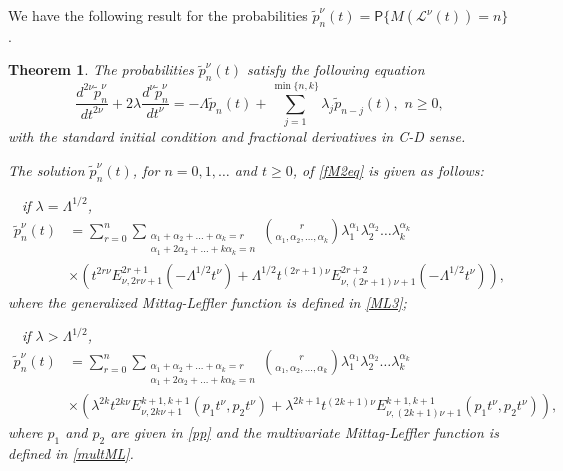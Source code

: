 \documentclass[12pt]{article}
\theoremstyle{definition}
\theoremstyle{plain}
\newtheorem{theorem}{Theorem}
\newcommand{\Prob}{\mathsf{P}}
\begin{document}
We have the following result for the probabilities ${\tilde p}_n^\nu(t)=\Prob\{M(\mathcal{L}^\nu(t))=n\}$.


\begin{theorem}\label{fM2}
The probabilities ${\tilde p}_n^\nu(t)$
satisfy the following  equation
\begin{equation}\label{fM2eq}
	\frac{d^{2\nu} \tilde p_n^\nu}{dt^{2\nu}} + 2\lambda \frac{d^\nu \tilde p_n^\nu}{dt^\nu} = - \Lambda \tilde p_n(t) + \sum_{j=1}^{\min\{n,k\}}\lambda_j \tilde p_{n-j}(t), \,\, n\geq0,
\end{equation}
with the standard initial condition and fractional derivatives in C-D sense.

	The solution ${\tilde p}_n^\nu(t)$, for $n = 0, 1, \dots$ and $t \ge 0$, of \eqref{fM2eq} is given as follows:
	\begin{description}
	\item $\quad$if $\lambda=\Lambda^{1/2}$,
	\begin{align}\label{pGFCP}
		\tilde p_n^\nu(t) &= \sum_{r=0}^n \sum_{\substack{\alpha_1+\alpha_2+\dots+\alpha_k=r \\ \alpha_1+2\alpha_2+\dots+k\alpha_k=n}} \binom{r}{\alpha_1, \alpha_2, \dots, \alpha_k} \lambda_1^{\alpha_1} \lambda_2^{\alpha_2} \dots \lambda_k^{\alpha_k} \nonumber \\
				&\times  \left(t^{2r\nu} E_{\nu, 2r\nu+1}^{2r+1}(-\Lambda^{1/2} t^\nu) + \Lambda^{1/2} t^{(2r+1)\nu} E_{\nu, (2r+1)\nu+1}^{2r+2}(-\Lambda^{1/2} t^\nu)\right),
	\end{align}
	where the generalized Mittag-Leffler function is defined in \eqref{ML3};
		\item $\quad$if $\lambda>\Lambda^{1/2}$,
		\begin{align}\label{pGFCP2}
		\tilde p_n^\nu(t) &= \sum_{r=0}^n \sum_{\substack{\alpha_1+\alpha_2+\dots+\alpha_k=r \\ \alpha_1+2\alpha_2+\dots+k\alpha_k=n}} \binom{r}{\alpha_1, \alpha_2, \dots, \alpha_k} \lambda_1^{\alpha_1} \lambda_2^{\alpha_2} \dots \lambda_k^{\alpha_k} \nonumber \\
				&\times  \left(\lambda^{2k} t^{2k\nu} E_{\nu, 2k\nu+1}^{k+1, k+1}(p_1 t^\nu, p_2 t^\nu) + \lambda^{2k+1} t^{(2k+1)\nu} E_{\nu, (2k+1)\nu+1}^{k+1, k+1}(p_1 t^\nu, p_2 t^\nu)\right),
	\end{align}		
		where
		$p_1$ and  $p_2$ are given in \eqref{pp}
		and the multivariate Mittag-Leffler function is defined in \eqref{multML}.
	\end{description}
	
\end{theorem}
\end{document}
